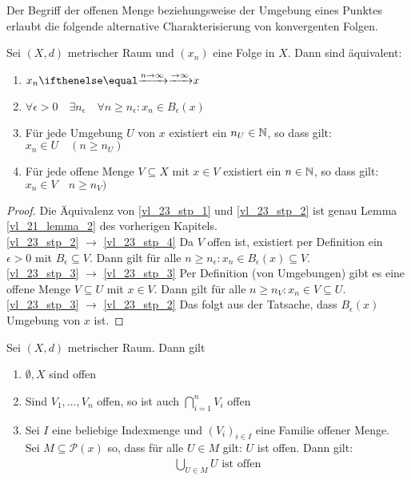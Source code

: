 Der Begriff der offenen Menge beziehungsweise der Umgebung eines Punktes erlaubt die 
folgende alternative Charakterisierung von konvergenten Folgen.

\begin{Lemma}{\label{vl_23_lemma_1}%
	Sei $(X,d)$ metrischer Raum und $(x_n)$ eine Folge in $X$. Dann sind äquivalent:
	\begin{enumerate}[label=({\roman{enumi}})]
		\item \label{vl_23_stp_1} $x_n \toinfty x$
		\item \label{vl_23_stp_2} $\forall \epsilon > 0 \quad \exists n_\epsilon \quad \forall n \geq 
			n_\epsilon: x_n \in B_\epsilon (x)$
		\item \label{vl_23_stp_3} Für jede Umgebung $U$ von $x$ existiert ein $n_U \in \mathbb{N}$, so dass 
			gilt: $x_n \in U \quad (n \geq n_U)$
		\item \label{vl_23_stp_4} Für jede offene Menge $V \subseteq X$ mit $x \in V$ existiert ein 
			$n \in \mathbb{N}$, so dass gilt: $x_n \in V \quad n \geq n_V)$
	\end{enumerate}
}\end{Lemma}
\begin{proof}
	Die Äquivalenz von \ref{vl_23_stp_1} und \ref{vl_23_stp_2} ist genau Lemma~
	\ref{vl_21_lemma_2}
	des vorherigen Kapitels. \\
	\ref{vl_23_stp_2} $\rightarrow$ \ref{vl_23_stp_4} Da $V$ offen ist, existiert 
	per Definition ein $\epsilon > 0$ mit $B_\epsilon \subseteq V$. Dann gilt 
	für alle $n \geq n_\epsilon: x_n \in B_\epsilon(x) \subseteq V$.\\
	\ref{vl_23_stp_3} $\rightarrow$ \ref{vl_23_stp_3} Per Definition (von Umgebungen) gibt es eine offene Menge $V \subseteq U$ mit $x \in V$. Dann gilt 
	für alle $n \geq n_V: x_n \in V \subseteq U$.\\
	\ref{vl_23_stp_3} $\rightarrow$ \ref{vl_23_stp_2} Das folgt aus der Tatsache, 
	dass $B_\epsilon(x)$ Umgebung von $x$ ist.
\end{proof}

\begin{Proposition}{\label{vl_23_prop_1}%
	Sei $(X,d)$ metrischer Raum. Dann gilt
	\begin{enumerate}[label=(\subscript{T}{{\arabic*}})]
		\item \label{vl_23_stp_5} $\emptyset,X$ sind offen
		\item \label{vl_23_stp_6} Sind $V_1, \hdots, V_n$ offen, so ist auch $\bigcap_{i=1}^n V_i$ offen
		\item \label{vl_23_stp_7} Sei $I$ eine beliebige Indexmenge und $(V_i)_{i \in I}$ eine 
			Familie offener Menge.\\
			Sei $M \subseteq \mathcal{P}(x)$ so, dass für alle $U \in M$ gilt:
			$U$ ist offen. Dann gilt: 
			\begin{align*}
				\bigcup_{U \in M} U \text{ ist offen}
			\end{align*}
	\end{enumerate}
}\end{Proposition}


